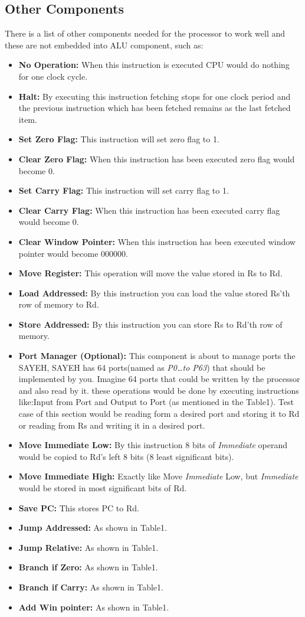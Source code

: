 \documentclass{report}
\begin{document}
\subsection{Other Components}
There is a list of other components needed for the processor to work well and these 		are not embedded into ALU component, such as:
\begin{itemize}
	\item \textbf{No Operation:}
		When this instruction is executed CPU would do nothing for one clock cycle.
	\item \textbf{Halt:}
		By executing this instruction fetching stops for one clock period and the 				previous instruction which has been fetched remains as the last fetched item.
	\item \textbf{Set Zero Flag:}
		This instruction will set zero flag to 1.
	\item \textbf{Clear Zero Flag:}
		When this instruction has been executed zero flag would become 0.
	\item \textbf{Set Carry Flag:}
		This instruction will set carry flag to 1.
	\item \textbf{Clear Carry Flag:}
		When this instruction has been executed carry flag would become 0.
	\item \textbf{Clear Window Pointer:}
		When this instruction has been executed window pointer would become 000000.
	\item \textbf{Move Register:}
		This operation will move the value stored in Rs to Rd.
	\item \textbf{Load Addressed:}
		By this instruction you can load the value stored Rs’th row of memory to Rd.
	\item \textbf{Store Addressed:}
		By this instruction you can store Rs to Rd’th row of memory.
	\item \textbf{Port Manager (Optional):} This component is about to manage ports the SAYEH, SAYEH has 64 ports(named as \textit{P0\ldots to P63}) that should be implemented by you.
		Imagine 64 ports that could be written by the processor and also read by it. these operations would be done by executing instructions like:Input from Port and Output to Port (as mentioned in the Table1).
		Test case of this section would be reading form a desired port and storing it to Rd or reading from Rs and writing it in a desired port.
	\item \textbf{Move Immediate Low:}
		By this instruction 8 bits of \textit{Immediate} operand would be copied to Rd’s left 8 bits (8 least significant bits).
	\item \textbf{Move Immediate High:}
		Exactly like Move \textit{Immediate} Low, but \textit{Immediate} would be stored in most significant bits of Rd.
	\item \textbf{Save PC:} This stores PC to Rd.
	\item \textbf{Jump Addressed:} As shown in Table1.
	\item \textbf{Jump Relative:} As shown in Table1.
	\item \textbf{Branch if Zero:} As shown in Table1.
	\item \textbf{Branch if Carry:} As shown in Table1.
	\item \textbf{Add Win pointer:} As shown in Table1.
\end{itemize}
\end{document}
